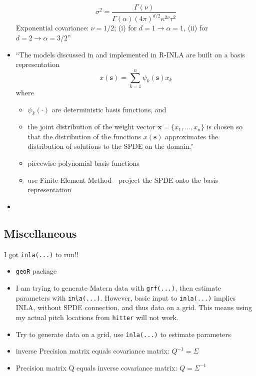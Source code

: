 \documentclass{article}
\begin{document}
\begin{itemize}
$$\sigma^{2} = \frac{\Gamma(\nu)}{\Gamma(\alpha)(4\pi)^{d/2}\kappa^{2\nu}\tau^{2}}$$
Exponential covariance: $\nu = 1/2$; (i) for $d = 1 \rightarrow  \alpha = 1$, (ii) for $d = 2 \rightarrow \alpha = 3/2$''
\item ``The models discussed in \cite{Lindgren2011} and implemented in R-INLA are built on a basis representation
$$ x(\pmb{s}) = \sum_{k=1}^{n} \psi_{k}(\pmb{s})x_{k}$$
where
      \begin{itemize}
      \item $\psi_{k}(\cdot)$ are deterministic basis functions, and
      \item the joint distribution of the weight vector $\pmb{x} = \{x_{1},\dots,x_{n}\}$ is chosen so that the distribution of the functions $x(\pmb{s})$ approximates the distribution of solutions to the SPDE on the domain.''
      \item piecewise polynomial basis functions
      \item use Finite Element Method - project the SPDE onto the basis representation 
      \end{itemize}
\item 
\end{itemize}

\subsection*{Miscellaneous}
I got \verb|inla(...)| to run!!
\begin{itemize}
\item \verb|geoR| package
\item I am trying to generate Matern data with \verb|grf(...)|, then estimate parameters with \verb|inla(...)|. However, basic input to \verb|inla(...)| implies INLA, without SPDE connection, and thus data on a grid. This means using my actual pitch locations from \verb|hitter| will not work. \\
\item Try to generate data on a grid, use \verb|inla(...)| to estimate parameters
\item inverse Precision matrix equals covariance matrix: $Q^{-1} = \Sigma$
\item Precision matrix Q equals inverse covariance matrix: $Q = \Sigma^{-1}$
\end{itemize}
\end{document}
